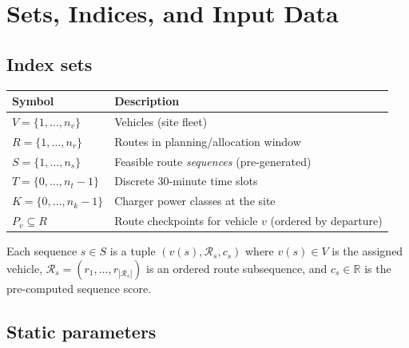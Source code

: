 \documentclass[11pt,a4paper]{article}
\newcommand{\R}{\mathbb{R}}
\newcommand{\1}{\mathbf{1}}
\begin{document}
\section{Sets, Indices, and Input Data}

\subsection{Index sets}

\begin{center}
\begin{tabular}{@{}ll@{}}
\toprule
Symbol & Description \\
\midrule
$V = \{1,\ldots,n_v\}$ & Vehicles (site fleet) \\
$R = \{1,\ldots,n_r\}$ & Routes in planning/allocation window \\
$S = \{1,\ldots,n_s\}$ & Feasible route \emph{sequences} (pre-generated) \\
$T = \{0,\ldots,n_t-1\}$ & Discrete 30-minute time slots \\
$K = \{0,\ldots,n_k-1\}$ & Charger power classes at the site \\
$P_v \subseteq R$ & Route checkpoints for vehicle $v$ (ordered by departure) \\
\bottomrule
\end{tabular}
\end{center}

Each sequence $s \in S$ is a tuple $(v(s), \mathcal{R}_s, c_s)$ where $v(s) \in V$ is
the assigned vehicle, $\mathcal{R}_s = (r_1,\ldots,r_{|\mathcal{R}_s|})$ is an ordered
route subsequence, and $c_s \in \R$ is the pre-computed sequence score.

\subsection{Static parameters}
\end{document}
